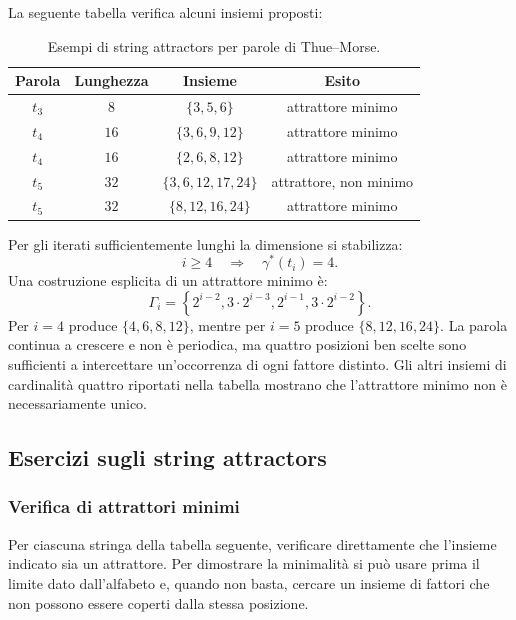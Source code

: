 \documentclass{article}
\theoremstyle{definition}
\numberwithin{equation}{section}
\begin{document}
La seguente tabella verifica alcuni insiemi proposti:
\begin{table}[htpb]
    \centering
    \small
    \begin{tabular}{c|c|c|c}
        \textbf{Parola} & \textbf{Lunghezza} & \textbf{Insieme}   &
        \textbf{Esito}                                                                     \\ \hline
        $t_3$           & $8$                & $\{3,5,6\}$        & attrattore minimo      \\
        $t_4$           & $16$               & $\{3,6,9,12\}$     & attrattore minimo      \\
        $t_4$           & $16$               & $\{2,6,8,12\}$     & attrattore minimo      \\
        $t_5$           & $32$               & $\{3,6,12,17,24\}$ & attrattore, non minimo \\
        $t_5$           & $32$               & $\{8,12,16,24\}$   & attrattore minimo
    \end{tabular}
    \caption{Esempi di string attractors per parole di Thue--Morse.}
    \label{tab:thue_morse_attractors}
\end{table}

Per gli iterati sufficientemente lunghi la dimensione si stabilizza:
\begin{equation}\label{eq:thue_morse_attractor_size}
    i\geq 4
    \quad\Longrightarrow\quad
    \gamma^*(t_i)=4.
\end{equation}
Una costruzione esplicita di un attrattore minimo è:
\[
    \Gamma_i
    =
    \left\{
    2^{i-2},
    3\cdot 2^{i-3},
    2^{i-1},
    3\cdot 2^{i-2}
    \right\}.
\]
Per $i=4$ produce $\{4,6,8,12\}$, mentre per $i=5$ produce
$\{8,12,16,24\}$. La parola continua a crescere e non è periodica, ma quattro
posizioni ben scelte sono sufficienti a intercettare un'occorrenza di ogni
fattore distinto. Gli altri insiemi di cardinalità quattro riportati nella
tabella mostrano che l'attrattore minimo non è necessariamente unico.

\subsection{Esercizi sugli string attractors}
\subsubsection{Verifica di attrattori minimi}
Per ciascuna stringa della tabella seguente, verificare direttamente che
l'insieme indicato sia un attrattore. Per dimostrare la minimalità si può usare
prima il limite dato dall'alfabeto e, quando non basta, cercare un insieme di
fattori che non possono essere coperti dalla stessa posizione.
\end{document}
